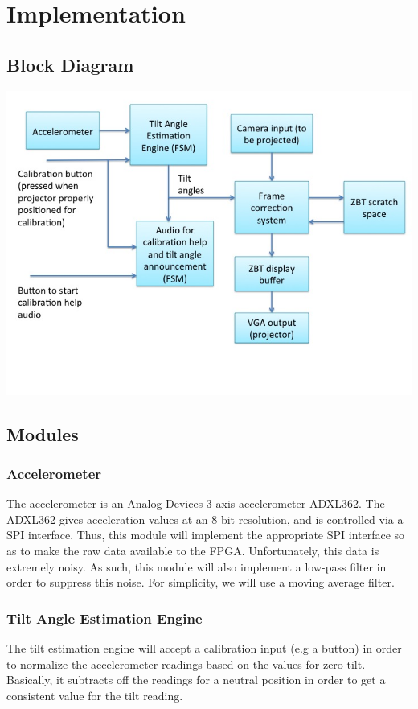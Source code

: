 \documentclass{article}
\begin{document}
\section{Implementation}

\subsection{Block Diagram}
\includegraphics[width=\textwidth]{img/block_diag}

\subsection{Modules}

\subsubsection{Accelerometer}
The accelerometer is an Analog Devices 3 axis accelerometer ADXL362.
The ADXL362 gives acceleration values at an 8 bit resolution, and is controlled via a SPI interface.
Thus, this module will implement the appropriate SPI interface so as to make the raw data available to the FPGA.
Unfortunately, this data is extremely noisy.
As such, this module will also implement a low-pass filter in order to suppress this noise.
For simplicity, we will use a moving average filter.

\subsubsection{Tilt Angle Estimation Engine}
The tilt estimation engine will accept a calibration input (e.g a button) in order to normalize the accelerometer readings based on the values for zero tilt.
Basically, it subtracts off the readings for a neutral position in order to get a consistent value for the tilt reading.
\end{document}
